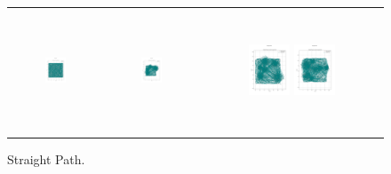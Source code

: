 \begin{figure}[p]
\begin{tabular}{ccc}
        \includegraphics[height=36mm,width=0.24\textwidth]{Images/simulation_no_obs/straight_paths/51.png}
        & \includegraphics[height=36mm,width=0.24\textwidth]{Images/simulation_no_obs/straight_paths/52.png}
        & \includegraphics[height=36mm,width=0.24\textwidth]{Images/simulation_no_obs/straight_paths/53.png}
        \includegraphics[height=36mm,width=0.24\textwidth]{Images/simulation_no_obs/straight_paths/54.png}\\[-4pt]

    \end{tabular}
    \caption{Straight Path.\label{fig:straight_path}}
\end{figure}


\vspace{3mm}



